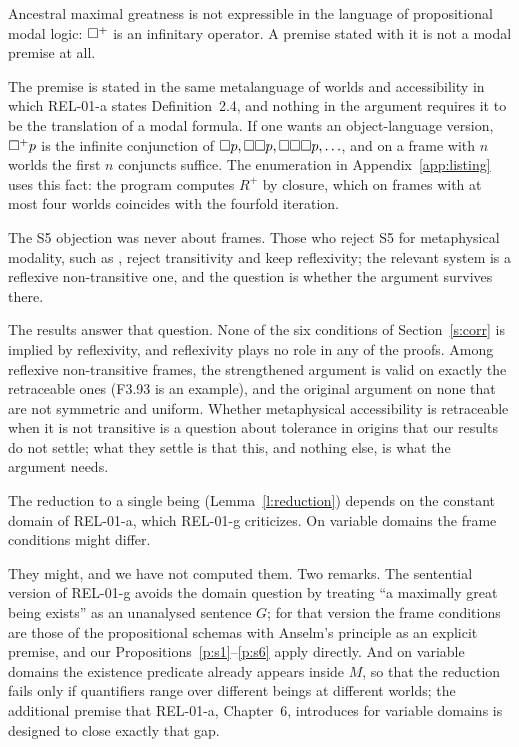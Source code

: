 \documentclass{situationist-preprint}
\newcommand{\Rp}{R^{+}}
\newcommand{\nplus}{\nec^{+}}
\begin{document}
\begin{objection}
Ancestral maximal greatness is not expressible in the language of propositional modal logic: $\nplus$ is an infinitary operator. A premise stated with it is not a modal premise at all.
\end{objection}

\begin{reply}
The premise is stated in the same metalanguage of worlds and accessibility in which REL-01-a states Definition~2.4, and nothing in the argument requires it to be the translation of a modal formula. If one wants an object-language version, $\nplus p$ is the infinite conjunction of $\mathord{\Box} p, \mathord{\Box}\mathord{\Box} p, \mathord{\Box}\mathord{\Box}\mathord{\Box} p, \ldots$, and on a frame with $n$ worlds the first $n$ conjuncts suffice. The enumeration in Appendix~\ref{app:listing} uses this fact: the program computes $\Rp$ by closure, which on frames with at most four worlds coincides with the fourfold iteration.
\end{reply}

\begin{objection}
The S5 objection was never about frames. Those who reject S5 for metaphysical modality, such as \citet{Salmon1989}, reject transitivity and keep reflexivity; the relevant system is a reflexive non-transitive one, and the question is whether the argument survives there.
\end{objection}

\begin{reply}
The results answer that question. None of the six conditions of Section~\ref{s:corr} is implied by reflexivity, and reflexivity plays no role in any of the proofs. Among reflexive non-transitive frames, the strengthened argument is valid on exactly the retraceable ones (F3.93 is an example), and the original argument on none that are not symmetric and uniform. Whether metaphysical accessibility is retraceable when it is not transitive is a question about tolerance in origins that our results do not settle; what they settle is that this, and nothing else, is what the argument needs.
\end{reply}

\begin{objection}
The reduction to a single being (Lemma~\ref{l:reduction}) depends on the constant domain of REL-01-a, which REL-01-g criticizes. On variable domains the frame conditions might differ.
\end{objection}

\begin{reply}
They might, and we have not computed them. Two remarks. The sentential version of REL-01-g avoids the domain question by treating \enquote{a maximally great being exists} as an unanalysed sentence $G$; for that version the frame conditions are those of the propositional schemas with Anselm's principle as an explicit premise, and our Propositions~\ref{p:s1}--\ref{p:s6} apply directly. And on variable domains the existence predicate already appears inside $M$, so that the reduction fails only if quantifiers range over different beings at different worlds; the additional premise that REL-01-a, Chapter~6, introduces for variable domains is designed to close exactly that gap.
\end{reply}
\end{document}
